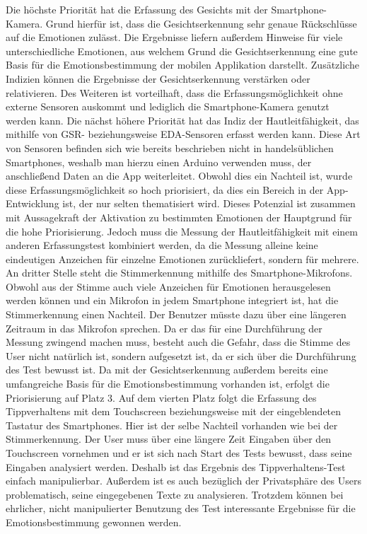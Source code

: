 Die höchste Priorität hat die Erfassung des Gesichts mit der Smartphone-Kamera. Grund hierfür ist, dass die Gesichtserkennung sehr genaue Rückschlüsse auf die Emotionen zulässt. Die Ergebnisse liefern außerdem Hinweise für viele unterschiedliche Emotionen, aus welchem Grund die Gesichtserkennung eine gute Basis für die Emotionsbestimmung der mobilen Applikation darstellt. Zusätzliche Indizien können die Ergebnisse der Gesichtserkennung verstärken oder relativieren. Des Weiteren ist vorteilhaft, dass die Erfassungsmöglichkeit ohne externe Sensoren auskommt und lediglich die Smartphone-Kamera genutzt werden kann. 
\newline
Die nächst höhere Priorität hat das Indiz der Hautleitfähigkeit, das mithilfe von GSR- beziehungsweise EDA-Sensoren erfasst werden kann. Diese Art von Sensoren befinden sich wie bereits beschrieben nicht in handelsüblichen Smartphones, weshalb man hierzu einen Arduino verwenden muss, der anschließend Daten an die App weiterleitet. Obwohl dies ein Nachteil ist, wurde diese Erfassungsmöglichkeit so hoch priorisiert, da dies ein Bereich in der App-Entwicklung ist, der nur selten thematisiert wird. Dieses Potenzial ist zusammen mit Aussagekraft der Aktivation zu bestimmten Emotionen der Hauptgrund für die hohe Priorisierung. Jedoch muss die Messung der Hautleitfähigkeit mit einem anderen Erfassungstest kombiniert werden, da die Messung alleine keine eindeutigen Anzeichen für einzelne Emotionen zurückliefert, sondern für mehrere.\newline
An dritter Stelle steht die Stimmerkennung mithilfe des Smartphone-Mikrofons. Obwohl aus der Stimme auch viele Anzeichen für Emotionen herausgelesen werden können und ein Mikrofon in jedem Smartphone integriert ist, hat die Stimmerkennung einen Nachteil. Der Benutzer müsste dazu über eine längeren Zeitraum in das Mikrofon sprechen. Da er das für eine Durchführung der Messung zwingend machen muss, besteht auch die Gefahr, dass die Stimme des User nicht natürlich ist, sondern aufgesetzt ist, da er sich über die Durchführung des Test bewusst ist. Da mit der Gesichtserkennung außerdem bereits eine umfangreiche Basis für die Emotionsbestimmung vorhanden ist, erfolgt die Priorisierung auf Platz 3. \newline
Auf dem vierten Platz folgt die Erfassung des Tippverhaltens mit dem Touchscreen beziehungsweise mit der eingeblendeten Tastatur des Smartphones. Hier ist der selbe Nachteil vorhanden wie bei der Stimmerkennung. Der User muss über eine längere Zeit Eingaben über den Touchscreen vornehmen und er ist sich nach Start des Tests bewusst, dass seine Eingaben analysiert werden. Deshalb ist das Ergebnis des Tippverhaltens-Test einfach manipulierbar. Außerdem ist es auch bezüglich der Privatsphäre des Users problematisch, seine eingegebenen Texte zu analysieren. Trotzdem können bei ehrlicher, nicht manipulierter Benutzung des Test interessante Ergebnisse für die Emotionsbestimmung gewonnen werden. \newline
